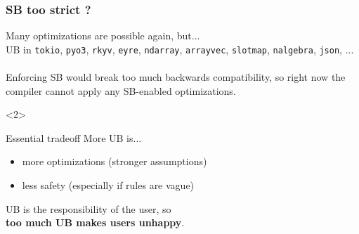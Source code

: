 \begin{frame}[t]
    \frametitle{SB too strict ?}
    Many optimizations are possible again, but...~\\

    UB in \texttt{tokio}, \texttt{pyo3}, \texttt{rkyv}, \texttt{eyre},
    \texttt{ndarray}, \texttt{arrayvec}, \texttt{slotmap}, \texttt{nalgebra},
    \texttt{json}, ...~\\~\\

    Enforcing SB would break too much backwards compatibility,
    so right now the compiler cannot apply any SB-enabled optimizations.

    \begin{onlyenv}<2>
        \begin{block}{Essential tradeoff}
            More UB is...
            \begin{itemize}
                \item more optimizations (stronger assumptions)
                \item less safety (especially if rules are vague)
            \end{itemize}
        \end{block}
        \begin{block}{}
            UB is the responsibility of the user, so\\
            \textbf{too much UB makes users unhappy}.
        \end{block}
    \end{onlyenv}
\end{frame}

